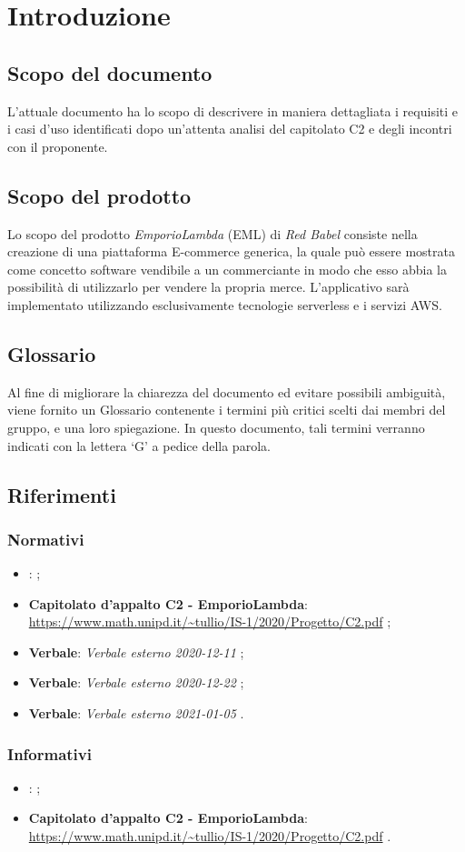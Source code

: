 \section{Introduzione}
\subsection{Scopo del documento}
L'attuale documento ha lo scopo di descrivere in maniera dettagliata i requisiti e i casi d'uso identificati dopo un'attenta analisi del capitolato C2 e degli incontri con il proponente.
\subsection{Scopo del prodotto}
Lo scopo del prodotto \textit{EmporioLambda} (EML) di \textit{Red Babel} consiste nella creazione di una piattaforma E-commerce generica, la quale può essere mostrata come concetto software vendibile a un commerciante in modo che esso abbia la possibilità di utilizzarlo per vendere la propria merce. L'applicativo sarà implementato utilizzando esclusivamente tecnologie serverless e i servizi AWS.
\subsection{Glossario}
Al fine di migliorare la chiarezza del documento ed evitare possibili ambiguità, viene fornito un Glossario contenente i termini più critici scelti dai membri del gruppo, e una loro spiegazione. In questo documento, tali termini verranno indicati con la lettera `G' a pedice della parola.
\subsection{Riferimenti}
\subsubsection{Normativi}
\begin{itemize}
\item \textbf{\NdP}:  ;
\item \textbf{Capitolato d'appalto C2 - EmporioLambda}: \\ \url{https://www.math.unipd.it/~tullio/IS-1/2020/Progetto/C2.pdf} ;
\item \textbf{Verbale}: \textit{Verbale esterno 2020-12-11} ;
\item \textbf{Verbale}: \textit{Verbale esterno 2020-12-22} ;
\item \textbf{Verbale}: \textit{Verbale esterno 2021-01-05} .
\end{itemize}
\subsubsection{Informativi}
\begin{itemize}
\item \textbf{\SdF}:  ;
\item \textbf{Capitolato d'appalto C2 - EmporioLambda}: \\ \url{https://www.math.unipd.it/~tullio/IS-1/2020/Progetto/C2.pdf} .
\end{itemize}